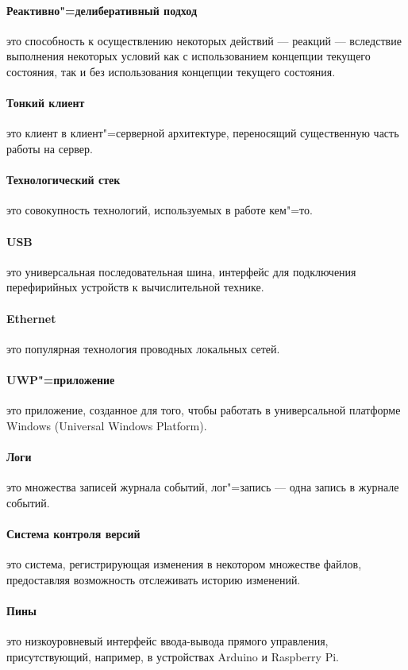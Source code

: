 \paragraph*{Реактивно"=делиберативный подход} это способность к осуществлению некоторых действий --- реакций --- вследствие выполнения некоторых условий как с использованием концепции текущего состояния, так и без использования концепции текущего состояния.

\paragraph*{Тонкий клиент} это клиент в клиент"=серверной архитектуре, переносящий существенную часть работы на сервер.

\paragraph*{Технологический стек} это совокупность технологий, используемых в работе кем"=то.

\paragraph*{USB} это универсальная последовательная шина, интерфейс для подключения перефирийных устройств к вычислительной технике.

\paragraph*{Ethernet} это популярная технология проводных локальных сетей.

\paragraph*{UWP"=приложение} это приложение, созданное для того, чтобы работать в универсальной платформе Windows (Universal Windows Platform).

\paragraph*{Логи} это множества записей журнала событий, лог"=запись --- одна запись в журнале событий.

\paragraph*{Система контроля версий} это система, регистрирующая изменения в некотором множестве файлов, предоставляя возможность отслеживать историю изменений.

\paragraph*{Пины} это низкоуровневый интерфейс ввода-вывода прямого управления, присутствующий, например, в устройствах Arduino и Raspberry Pi.